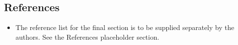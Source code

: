 \subsection*{References}
\begin{itemize}
  \item The reference list for the final section is to be supplied
        separately by the authors. See the References placeholder section.
\end{itemize}
